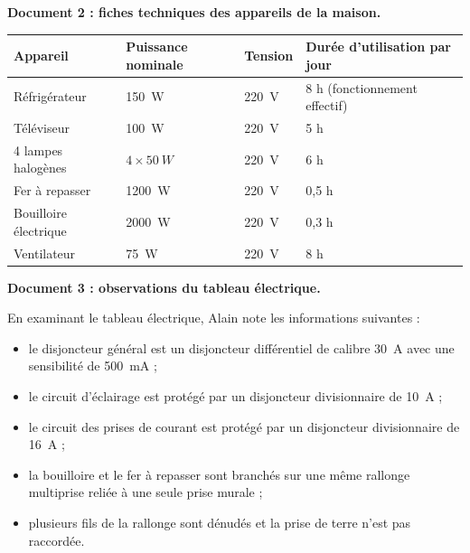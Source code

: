 \documentclass[11pt]{article}
\begin{document}
\textbf{Document 2 : fiches techniques des appareils de la maison.}

\begin{center}
\begin{tabularx}{\linewidth}{|l|X|X|X|}
\hline
\rowcolor{popblueL} \textbf{Appareil} & \textbf{Puissance nominale} & \textbf{Tension} & \textbf{Durée d'utilisation par jour} \\
\hline
Réfrigérateur & \SI{150}{W} & \SI{220}{V} & 8 h (fonctionnement effectif) \\
\hline
Téléviseur & \SI{100}{W} & \SI{220}{V} & 5 h \\
\hline
4 lampes halogènes & $4 \times \SI{50}{W}$ & \SI{220}{V} & 6 h \\
\hline
Fer à repasser & \SI{1200}{W} & \SI{220}{V} & 0,5 h \\
\hline
Bouilloire électrique & \SI{2000}{W} & \SI{220}{V} & 0,3 h \\
\hline
Ventilateur & \SI{75}{W} & \SI{220}{V} & 8 h \\
\hline
\end{tabularx}
\end{center}

\textbf{Document 3 : observations du tableau électrique.}

En examinant le tableau électrique, Alain note les informations suivantes :

\begin{itemize}
\item le disjoncteur général est un disjoncteur différentiel de calibre \SI{30}{A} avec une sensibilité de \SI{500}{mA} ;
\item le circuit d'éclairage est protégé par un disjoncteur divisionnaire de \SI{10}{A} ;
\item le circuit des prises de courant est protégé par un disjoncteur divisionnaire de \SI{16}{A} ;
\item la bouilloire et le fer à repasser sont branchés sur une même rallonge multiprise reliée à une seule prise murale ;
\item plusieurs fils de la rallonge sont dénudés et la prise de terre n'est pas raccordée.
\end{itemize}
\end{document}
